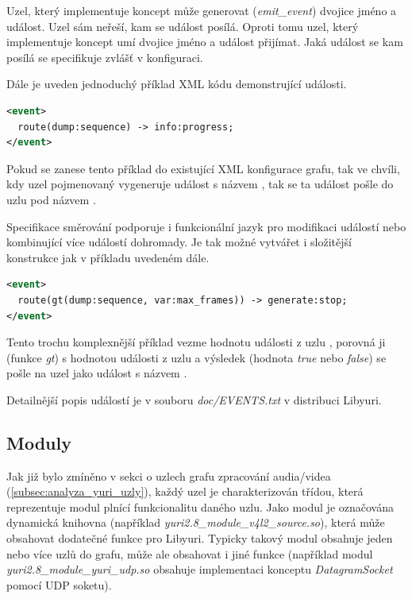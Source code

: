\documentclass[thesis=M,czech]{FITthesis}[2012/06/26]
\begin{document}
Uzel, který implementuje koncept  může generovat (\textit{emit\_event}) dvojice jméno a událost. Uzel sám neřeší, kam se událost posílá. Oproti tomu uzel, který implementuje koncept  umí dvojice jméno a událost přijímat. Jaká událost se kam posílá se specifikuje zvlášť v konfiguraci.

Dále je uveden jednoduchý příklad XML kódu demonstrující události.\\

\begin{lstlisting}[language=XML]
<event>
  route(dump:sequence) -> info:progress;
</event>
\end{lstlisting}
Pokud se zanese tento příklad do existující XML konfigurace grafu, tak ve chvíli, kdy uzel pojmenovaný  vygeneruje událost s názvem , tak se ta událost pošle do uzlu  pod názvem .

Specifikace směrování podporuje i funkcionální jazyk pro modifikaci událostí nebo kombinující více událostí dohromady. Je tak možné vytvářet i složitější konstrukce jak v příkladu uvedeném dále.\\

\begin{lstlisting}[language=XML]
<event>
  route(gt(dump:sequence, var:max_frames)) -> generate:stop;
</event>
\end{lstlisting}

Tento trochu komplexnější příklad vezme hodnotu události  z uzlu , porovná ji (funkce \textit{gt}) s hodnotou události  z uzlu  a výsledek (hodnota \textit{true} nebo \textit{false}) se pošle na uzel  jako událost s názvem .

Detailnější popis událostí je v souboru \textit{doc/EVENTS.txt} v distribuci Libyuri.
	
\subsection{Moduly} \label{subsec:analyza_yuri_moduly}
Jak již bylo zmíněno v sekci o uzlech grafu zpracování audia/videa (\ref{subsec:analyza_yuri_uzly}), každý uzel je charakterizován třídou, která reprezentuje modul plnící funkcionalitu daného uzlu. Jako modul je označována dynamická knihovna (například \textit{yuri2.8\_module\_v4l2\_source.so}), která může obsahovat dodatečné funkce pro Libyuri. Typicky takový modul obsahuje jeden nebo více uzlů do grafu, může ale obsahovat i jiné funkce (například modul \textit{yuri2.8\_module\_yuri\_udp.so} obsahuje implementaci konceptu \textit{DatagramSocket} pomocí UDP soketu). 
\end{document}
